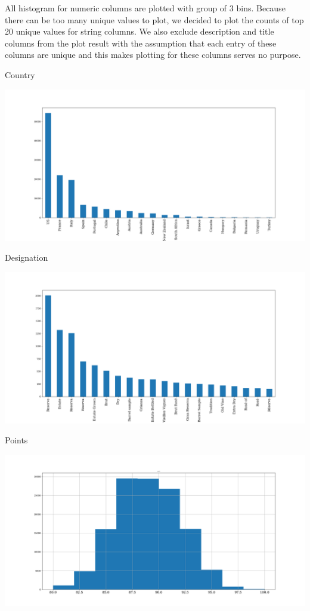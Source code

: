 \documentclass[11pt]{article}
\begin{document}
All histogram for numeric columns are plotted with group of 3 bins. Because there can be too many unique values to plot, we decided to plot the counts of top 20 unique values for string columns. We also exclude description and title columns from the plot result with the assumption that each entry of these columns are unique and this makes plotting for these columns serves no purpose.

Country

\includegraphics[width=\textwidth,height=\textheight,keepaspectratio]{figures/1c_histogram_of_country.png}

Designation

\includegraphics[width=\textwidth,height=\textheight,keepaspectratio]{figures/1c_histogram_of_designation.png}

Points

\includegraphics[width=\textwidth,height=\textheight,keepaspectratio]{figures/1c_histogram_of_points.png}
\end{document}

